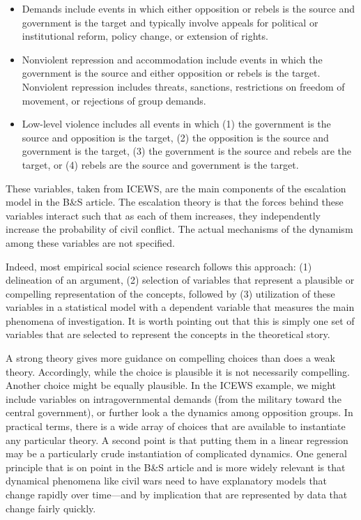 \documentclass[
]{article}
\begin{document}
\begin{itemize}
\item Demands include events in which either opposition or rebels is the source and government is the target and typically involve appeals for political or institutional reform, policy change, or extension of rights.
\item Nonviolent repression and accommodation include events in which the government is the source and either opposition or rebels is the target. Nonviolent repression includes threats, sanctions, restrictions on freedom of movement, or rejections of group demands.
\item Low-level violence includes all events in which (1) the government is the source and opposition is the target, (2) the opposition is the source and government is the target, (3) the government is the source and rebels are the target, or (4) rebels are the source and government is the target.
\end{itemize}

These variables, taken from ICEWS, are the main components of the escalation model in the B\&S article. The escalation theory is that the forces behind these variables interact such that as each of them increases, they independently increase the probability of civil conflict. The actual mechanisms of the dynamism among these variables are not specified.

Indeed, most empirical social science research follows this approach: (1) delineation of an argument, (2) selection of variables that represent a plausible or compelling representation of the concepts, followed by (3) utilization of these variables in a statistical model with a dependent variable that measures the main phenomena of investigation. It is worth pointing out that this is simply one set of variables that are selected to represent the concepts in the theoretical story.

A strong theory gives more guidance on compelling choices than does a weak theory. Accordingly, while the choice is plausible it is not necessarily compelling. Another choice might be equally plausible. In the ICEWS example, we might include variables on intragovernmental demands (from the military toward the central government), or further look a the dynamics among opposition groups. In practical terms, there is a wide array of choices that are available to instantiate any particular theory. A second point is that putting them in a linear regression may be a particularly crude instantiation of complicated dynamics. One general principle that is on point in the B\&S article and is more widely relevant is that dynamical phenomena like civil wars need to have explanatory models that change rapidly over time---and by implication that are represented by data that change fairly quickly.
\end{document}
